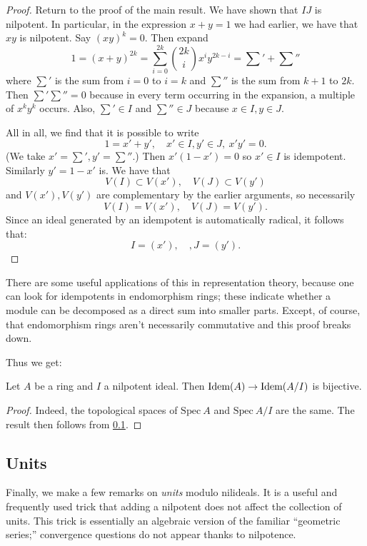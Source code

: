 \begin{proof}
Return to the proof of the main result.  We have shown that $IJ$ is nilpotent.  
In particular, in the expression $x+y=1$ we had earlier, we have that $xy$ is
nilpotent.  Say $(xy)^k = 0$. Then expand
\[ 1 = (x+y)^{2k} = \sum_{i=0}^{2k} \binom{2k}{i}x^i y^{2k-i} = \sum' + \sum''  \]
where $\sum'$ is the sum from $i=0$ to $i=k$ and $\sum''$ is the sum from
$k+1$ to $2k$. Then $\sum' \sum'' = 0$ because in every term occurring in the
expansion, a multiple of $x^k y^k$ occurs. Also, $\sum' \in I$ and $\sum'' \in
J$ because $x \in I, y \in J$.

All in all, we find that it is possible to write
\[ 1 = x' + y', \quad x' \in I, y' \in J, \ x'y' = 0.  \]
(We take $x' = \sum', y' = \sum''$.)
Then $x'(1-x') = 0$ so $x' \in I$ is idempotent. Similarly $y' = 1-x'$ is. 
We have that 
\[ V(I) \subset V(x'), \quad V(J) \subset V(y')  \]
and $V(x'), V(y')$ are complementary by the earlier arguments, so necessarily
\[ V(I) = V(x'), \quad V(J) = V(y').  \]
Since an ideal generated by an idempotent is automatically radical, it follows
that:
\[ I = (x'), \quad, J = (y').  \]
\end{proof} 


There are some useful applications of this in representation theory, because
one can look for idempotents in endomorphism rings; these indicate whether a module can be decomposed as a direct sum into smaller parts.  Except, of course, that endomorphism rings aren't necessarily commutative and this proof breaks down.

Thus we get:
\begin{proposition} Let $A$ be a ring and $I$ a nilpotent ideal.  Then
$\operatorname{\text{Idem}}(A) \to \operatorname{\text{Idem}}(A/I)$ is bijective.
\end{proposition}
\begin{proof} 
Indeed, the topological spaces of $\mathrm{Spec} \   A$ and $\mathrm{Spec} \
A/I$ are the same.   The result then follows from \cref{}.
\end{proof} 


\subsection{Units}
Finally, we make a few remarks on \emph{units} modulo nilideals.
It is a useful and frequently used trick that adding a nilpotent does not
affect the collection of units. This trick is essentially an algebraic version of
the
familiar ``geometric series;'' convergence questions do not appear thanks to
nilpotence. 

